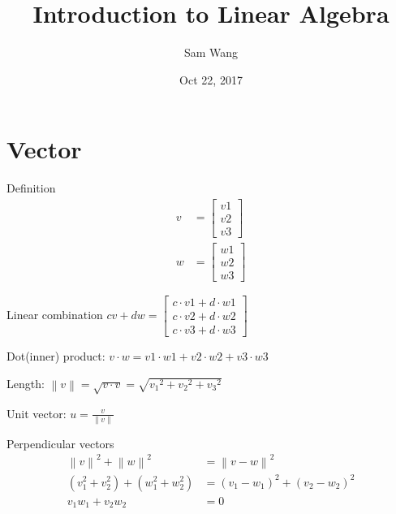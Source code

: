 \documentclass{article}
\title{Introduction to Linear Algebra}
\author{Sam Wang}
\date{Oct 22, 2017}
\begin{document}
\maketitle
\tableofcontents

\section{Vector}

Definition
\begin{align}
  v &= \begin{bmatrix}v1\\ v2\\ v3\end{bmatrix}\\
  w &= \begin{bmatrix}w1\\ w2\\ w3\end{bmatrix}
\end{align}

Linear combination
\(cv + dw = \begin{bmatrix}
  c\cdot v1+d\cdot w1\\ 
  c\cdot v2+d\cdot w2\\ 
  c\cdot v3+d\cdot w3
  \end{bmatrix} \)

Dot(inner) product:
\( v\cdot w = v1\cdot w1 + v2\cdot w2 + v3\cdot w3 \)

Length:
\( \left \| v \right \| = \sqrt {v\cdot v} = \sqrt { {v_{1}}^{2} + {v_{2}}^{2} + {v_{3}}^{2} } \)

Unit vector:
\( u = \frac {v}{\left \| v \right \|} \)

Perpendicular vectors
\begin{align}
{\left \| v \right \|}^{2} + {\left \| w \right \|}^{2} &= {\left \| v - w \right \|}^{2}\\
(v_{1}^{2} + v_{2}^{2}) + ( w_{1}^{2} + w_{2}^{2}) &= {(v_{1} - w_{1})}^{2} + {(v_{2} - w_{2})}^{2}\\
v_{1}w_{1} + v_{2}w_{2} &= 0
\end{align}
\end{document}
